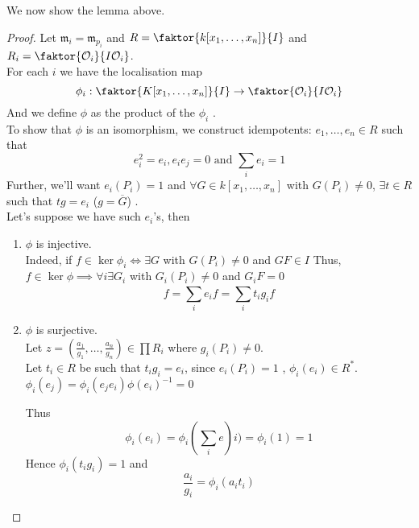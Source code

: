 \documentclass[../main.tex]{subfiles}
\begin{document}
We now show the lemma above.\\
\begin{proof}
	Let $\mathfrak{m}_i = \mathfrak{m}_{p_i} $ and $R= \faktor { k[x_1,\ldots,x_n]} { I} $ and $R_i = \faktor { \O_i} { I \O_i} $.\\
	For each $i$ we have the localisation map
	\[ 
		\phi_i:	\faktor{ K[x_1,\ldots,x_n] }{I}  \to \faktor { \O_i} { I \O_i} 
	\]
	And we define $\phi$  as the product of the $\phi_i$ .\\
	To show that $\phi$ is an isomorphism, we construct idempotents: $e_1,\ldots, e_n \in R$ such that
	\[ 
	e_i ^{2} = e_i, e_i e_j = 0 \text{ and } \sum_i e_i = 1
	\]
	Further, we'll want $e_i( P_i) =1$ and $\forall G\in  k[x_1,\ldots,x_n] $ with $G( P_i) \neq 0	$, $\exists t\in R$ such that $tg = e_i$ ($g= \overline{G}$) .\\
	Let's suppose we have such $e_i$'s, then
	\begin{enumerate}
	\item $\phi$ is injective.\\
		Indeed, if $f\in \ker\phi_i\iff \exists G$ with $G( P_i) \neq 0$ and $GF \in I$ 
		Thus, $f\in \ker\phi\implies \forall i \exists G_i$ with $G_i( P_i) \neq 0$ and $G_i F= 0$ 
		\[ 
		f= \sum_{i}^{ } e_i f = \sum_{i}^{ } t_i g_i f
		\]

	\item $\phi$ is surjective.\\
		Let $z= ( \frac{a_1}{g_1},\ldots, \frac{a_n}{g_n}) \in \prod R_i$ where $g_i( P_i) \neq 0$.\\
		Let $t_i \in R$ be such that $t_i g_i = e_i$, since $e_i ( P_i) =1$ , $\phi_i( e_i) \in R^{\ast}$.\\
		$\phi_i ( e_j) = \phi_i ( e_j e_i ) \phi( e_i)^{-1}= 0$
			
		Thus
		\[ 
		\phi_i(e_i  ) = \phi_i( \sum_i e)i) = \phi_i( 1) = 1 
		\]
		Hence $\phi_i( t_i g_i) = 1 $ and 
		\[ 
		\frac{a_i }{g_i}= \phi_i ( a_i t_i) 
		\]
		

\end{enumerate}
\end{proof}
\end{document}
